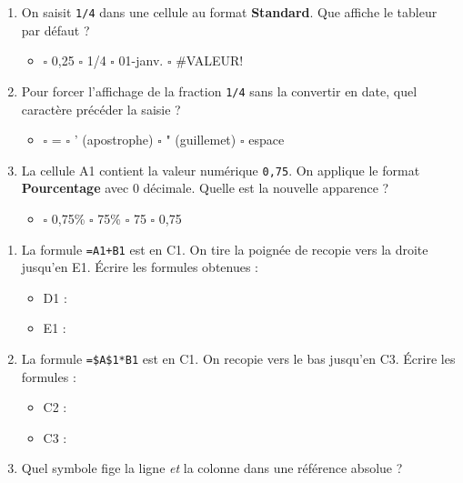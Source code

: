 \documentclass[11pt]{article}
\begin{document}
\begin{exercice}
\begin{enumerate}
    \item On saisit \texttt{1/4} dans une cellule au format \textbf{Standard}. Que affiche le tableur par défaut ?
    \begin{itemize}
        \item $\square$ 0,25 \quad $\square$ 1/4 \quad $\square$ 01-janv. \quad $\square$ \#VALEUR!
    \end{itemize}
    \item Pour forcer l'affichage de la fraction \texttt{1/4} sans la convertir en date, quel caractère précéder la saisie ?
    \begin{itemize}
        \item $\square$ = \quad $\square$ ' (apostrophe) \quad $\square$ " (guillemet) \quad $\square$ espace
    \end{itemize}
    \item La cellule A1 contient la valeur numérique \texttt{0,75}. On applique le format \textbf{Pourcentage} avec 0 décimale. Quelle est la nouvelle apparence ?
    \begin{itemize}
        \item $\square$ 0,75\% \quad $\square$ 75\% \quad $\square$ 75 \quad $\square$ 0,75
    \end{itemize}
\end{enumerate}
\end{exercice}

\begin{exercice}
\begin{enumerate}
    \item La formule \texttt{=A1+B1} est en C1. On tire la poignée de recopie vers la droite jusqu'en E1. Écrire les formules obtenues :
    \begin{itemize}
        \item D1 : \underline{\hspace{3cm}}
        \item E1 : \underline{\hspace{3cm}}
    \end{itemize}
    \item La formule \texttt{=\$A\$1*B1} est en C1. On recopie vers le bas jusqu'en C3. Écrire les formules :
    \begin{itemize}
        \item C2 : \underline{\hspace{3cm}}
        \item C3 : \underline{\hspace{3cm}}
    \end{itemize}
    \item Quel symbole fige la ligne \textit{et} la colonne dans une référence absolue ? \underline{\hspace{2cm}}
\end{enumerate}
\end{exercice}
\end{document}
